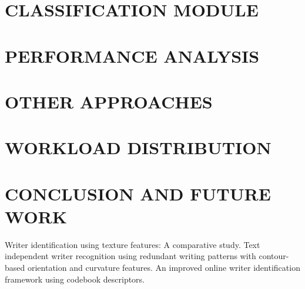 \documentclass[letterpaper, 10 pt, conference]{ieeeconf}  %
\begin{document}

\section{CLASSIFICATION MODULE}



\section{PERFORMANCE ANALYSIS}



\section{OTHER APPROACHES}



\section{WORKLOAD DISTRIBUTION}



\section{CONCLUSION AND FUTURE WORK}



\begin{thebibliography}{99}
 Writer identification using texture features: A comparative study.
 Text independent writer recognition using redundant writing patterns with contour-based orientation and curvature features.
 An improved online writer identification framework using codebook descriptors.
\end{thebibliography}

\end{document}
